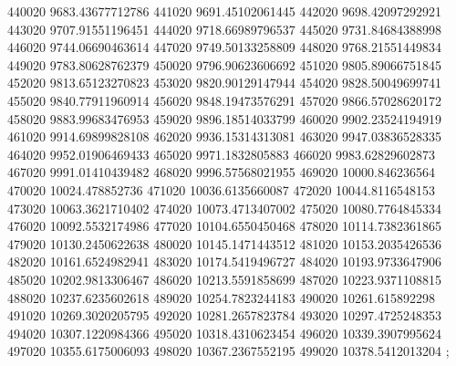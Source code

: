{440020 9683.43677712786
441020 9691.45102061445
442020 9698.42097292921
443020 9707.91551196451
444020 9718.66989796537
445020 9731.84684388998
446020 9744.06690463614
447020 9749.50133258809
448020 9768.21551449834
449020 9783.80628762379
450020 9796.90623606692
451020 9805.89066751845
452020 9813.65123270823
453020 9820.90129147944
454020 9828.50049699741
455020 9840.77911960914
456020 9848.19473576291
457020 9866.57028620172
458020 9883.99683476953
459020 9896.18514033799
460020 9902.23524194919
461020 9914.69899828108
462020 9936.15314313081
463020 9947.03836528335
464020 9952.01906469433
465020 9971.1832805883
466020 9983.62829602873
467020 9991.01410439482
468020 9996.57568021955
469020 10000.846236564
470020 10024.478852736
471020 10036.6135660087
472020 10044.8116548153
473020 10063.3621710402
474020 10073.4713407002
475020 10080.7764845334
476020 10092.5532174986
477020 10104.6550450468
478020 10114.7382361865
479020 10130.2450622638
480020 10145.1471443512
481020 10153.2035426536
482020 10161.6524982941
483020 10174.5419496727
484020 10193.9733647906
485020 10202.9813306467
486020 10213.5591858699
487020 10223.9371108815
488020 10237.6235602618
489020 10254.7823244183
490020 10261.615892298
491020 10269.3020205795
492020 10281.2657823784
493020 10297.4725248353
494020 10307.1220984366
495020 10318.4310623454
496020 10339.3907995624
497020 10355.6175006093
498020 10367.2367552195
499020 10378.5412013204
};

